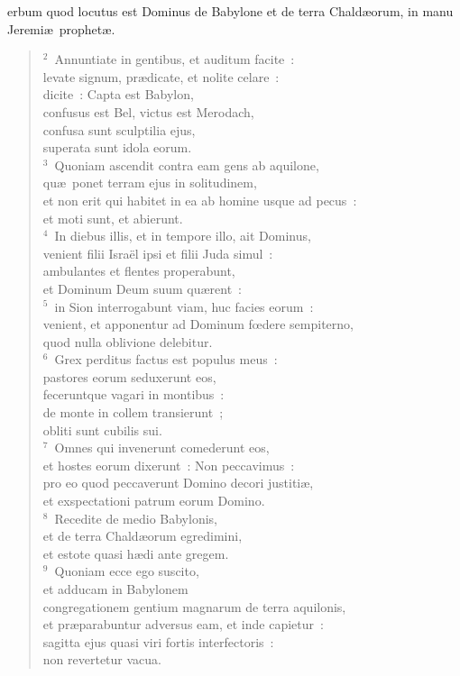 \bchapter
{}erbum quod locutus est Dominus de Babylone et de terra Chald\ae orum, in manu Jeremi\ae\ prophet\ae .
\begin{verse}${}^{2}$~Annuntiate in gentibus, et auditum facite~:\\ levate signum, pr\ae dicate, et nolite celare~:\\ dicite~: Capta est Babylon,\\ confusus est Bel, victus est Merodach,\\ confusa sunt sculptilia ejus,\\ superata sunt idola eorum.\\
${}^{3}$~Quoniam ascendit contra eam gens ab aquilone,\\ qu\ae\ ponet terram ejus in solitudinem,\\ et non erit qui habitet in ea ab homine usque ad pecus~:\\ et moti sunt, et abierunt.\\
${}^{4}$~In diebus illis, et in tempore illo, ait Dominus,\\ venient filii Isra\"el ipsi et filii Juda simul~:\\ ambulantes et flentes properabunt,\\ et Dominum Deum suum qu\ae rent~:\\
${}^{5}$~in Sion interrogabunt viam, huc facies eorum~:\\ venient, et apponentur ad Dominum fœdere sempiterno,\\ quod nulla oblivione delebitur.\\
${}^{6}$~Grex perditus factus est populus meus~:\\ pastores eorum seduxerunt eos,\\ feceruntque vagari in montibus~:\\ de monte in collem transierunt~;\\ obliti sunt cubilis sui.\\
${}^{7}$~Omnes qui invenerunt comederunt eos,\\ et hostes eorum dixerunt~: Non peccavimus~:\\ pro eo quod peccaverunt Domino decori justiti\ae ,\\ et exspectationi patrum eorum Domino.\\
${}^{8}$~Recedite de medio Babylonis,\\ et de terra Chald\ae orum egredimini,\\ et estote quasi h\ae di ante gregem.\\
${}^{9}$~Quoniam ecce ego suscito,\\ et adducam in Babylonem\\ congregationem gentium magnarum de terra aquilonis,\\ et pr\ae parabuntur adversus eam, et inde capietur~:\\ sagitta ejus quasi viri fortis interfectoris~:\\ non revertetur vacua.\\

\end{verse}
